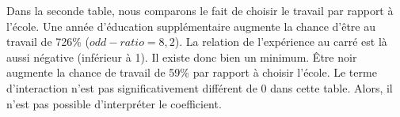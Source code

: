 \vspace*{0.3cm}

Dans la seconde table, nous comparons le fait de choisir le travail par rapport à l’école. Une année d’éducation supplémentaire augmente la chance d’être au travail de 726\% ($odd-ratio = 8,2$). La relation de l’expérience au carré est là aussi négative (inférieur à 1). Il existe donc bien un minimum. Être noir augmente la chance de travail de 59\% par rapport à choisir l’école. Le terme d’interaction n’est pas significativement différent de 0 dans cette table. Alors, il n’est pas possible d’interpréter le coefficient. 




